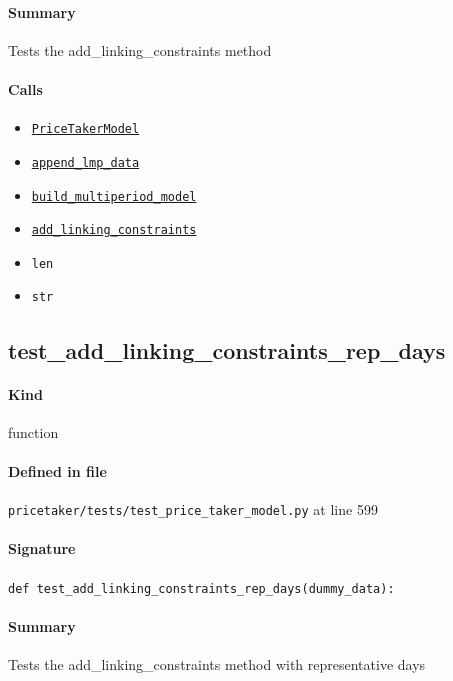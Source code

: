 \documentclass[11pt]{report}
\begin{document}
\paragraph{Summary} Tests the add\_linking\_constraints method
\paragraph{Calls}
\begin{itemize}[leftmargin=*]
  \item \hyperref[def:pricetaker-price_taker_model.py:PriceTakerModel:L161]{\texttt{PriceTakerModel}}
  \item \hyperref[def:pricetaker-price_taker_model.py:PriceTakerModel.append_lmp_data:L221]{\texttt{append\_lmp\_data}}
  \item \hyperref[def:pricetaker-price_taker_model.py:PriceTakerModel.build_multiperiod_model:L291]{\texttt{build\_multiperiod\_model}}
  \item \hyperref[def:pricetaker-price_taker_model.py:PriceTakerModel.add_linking_constraints:L564]{\texttt{add\_linking\_constraints}}
  \item \texttt{len}
  \item \texttt{str}
\end{itemize}
\subsection{test\_add\_linking\_constraints\_rep\_days}
\label{def:pricetaker-tests-test_price_taker_model.py:test_add_linking_constraints_rep_days:L599}
\paragraph{Kind} function
\paragraph{Defined in file} \texttt{pricetaker/tests/test\_price\_taker\_model.py} at line 599
\paragraph{Signature} \texttt{def test\_add\_linking\_constraints\_rep\_days(dummy\_data):}
\paragraph{Summary} Tests the add\_linking\_constraints method with representative days
\end{document}

